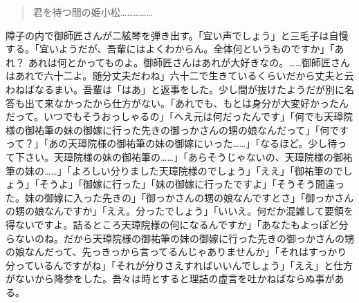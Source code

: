 \documentclass[12pt, openright]{book}
\begin{document}
\blockquote{君を待つ間の姫小松\ldots{}\ldots{}\ldots{}\ldots{}\ldots{}}

障子の内で御師匠さんが二絃琴を弾き出す。「宜い声でしょう」と三毛子は自慢する。「宜いようだが、吾輩にはよくわからん。全体何というものですか」「あれ？ あれは何とかってものよ。御師匠さんはあれが大好きなの。\ldots{}\ldots{}御師匠さんはあれで六十二よ。随分丈夫だわね」六十二で生きているくらいだから丈夫と云わねばなるまい。吾輩は「はあ」と返事をした。少し間が抜けたようだが別に名答も出て来なかったから仕方がない。「あれでも、もとは身分が大変好かったんだって。いつでもそうおっしゃるの」「へえ元は何だったんです」「何でも天璋院様の御祐筆の妹の御嫁に行った先きの御っかさんの甥の娘なんだって」「何ですって？」「あの天璋院様の御祐筆の妹の御嫁にいった\ldots{}\ldots{}」「なるほど。少し待って下さい。天璋院様の妹の御祐筆の\ldots{}\ldots{}」「あらそうじゃないの、天璋院様の御祐筆の妹の\ldots{}\ldots{}」「よろしい分りました天璋院様のでしょう」「ええ」「御祐筆のでしょう」「そうよ」「御嫁に行った」「妹の御嫁に行ったですよ」「そうそう間違った。妹の御嫁に入った先きの」「御っかさんの甥の娘なんですとさ」「御っかさんの甥の娘なんですか」「ええ。分ったでしょう」「いいえ。何だか混雑して要領を得ないですよ。詰るところ天璋院様の何になるんですか」「あなたもよっぽど分らないのね。だから天璋院様の御祐筆の妹の御嫁に行った先きの御っかさんの甥の娘なんだって、先っきっから言ってるんじゃありませんか」「それはすっかり分っているんですがね」「それが分りさえすればいいんでしょう」「ええ」と仕方がないから降参をした。吾々は時とすると理詰の虚言を吐かねばならぬ事がある。
\end{document}
